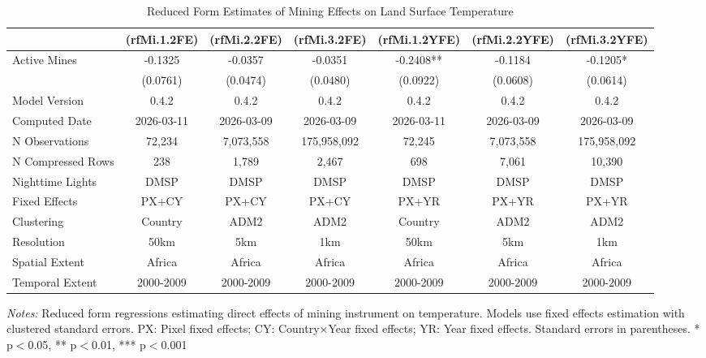 \begin{table}[htbp]
\centering
\footnotesize
\caption{Reduced Form Estimates of Mining Effects on Land Surface Temperature}
\begin{tabular}{lcccccc}
\toprule
 & (rfMi.1.2FE) & (rfMi.2.2FE) & (rfMi.3.2FE) & (rfMi.1.2YFE) & (rfMi.2.2YFE) & (rfMi.3.2YFE) \\
\midrule
Active Mines & -0.1325 & -0.0357 & -0.0351 & -0.2408** & -0.1184 & -0.1205* \\
 & (0.0761) & (0.0474) & (0.0480) & (0.0922) & (0.0608) & (0.0614) \\
\midrule
Model Version & 0.4.2 & 0.4.2 & 0.4.2 & 0.4.2 & 0.4.2 & 0.4.2 \\
Computed Date & 2026-03-11 & 2026-03-09 & 2026-03-09 & 2026-03-11 & 2026-03-09 & 2026-03-09 \\
N Observations & 72,234 & 7,073,558 & 175,958,092 & 72,245 & 7,073,558 & 175,958,092 \\
N Compressed Rows & 238 & 1,789 & 2,467 & 698 & 7,061 & 10,390 \\
\midrule
Nighttime Lights & DMSP & DMSP & DMSP & DMSP & DMSP & DMSP \\
Fixed Effects & PX+CY & PX+CY & PX+CY & PX+YR & PX+YR & PX+YR \\
Clustering & Country & ADM2 & ADM2 & Country & ADM2 & ADM2 \\
Resolution & 50km & 5km & 1km & 50km & 5km & 1km \\
Spatial Extent & Africa & Africa & Africa & Africa & Africa & Africa \\
Temporal Extent & 2000-2009 & 2000-2009 & 2000-2009 & 2000-2009 & 2000-2009 & 2000-2009 \\
\bottomrule
\end{tabular}
\begin{threeparttable}
\begin{tablenotes}\small
\item \textit{Notes:} Reduced form regressions estimating direct effects of mining instrument on temperature. Models use  fixed effects estimation with clustered standard errors. PX: Pixel fixed effects; CY: Country×Year fixed effects; YR: Year fixed effects. Standard errors in parentheses. * p$<$0.05, ** p$<$0.01, *** p$<$0.001
\end{tablenotes}
\end{threeparttable}
\end{table}